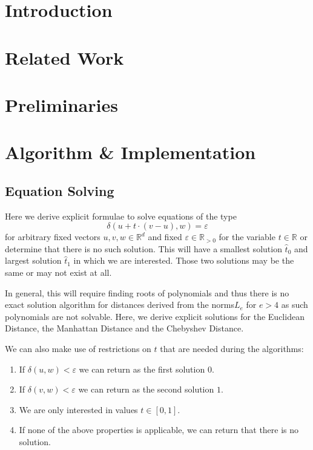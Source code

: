\newcommand{\N}{\mathbb{N}}
\newcommand{\Z}{\mathbb{Z}}
\newcommand{\R}{\mathbb{R}}


\renewcommand*{\O}{\mathcal{O}}

\section{Introduction}
\label{sec:introduction}

\section{Related Work}
\label{sec:related_work}

\section{Preliminaries}
\label{sec:preliminaries}

\section{Algorithm \& Implementation}
\label{sec:algorithm_implementation}


\subsection{Equation Solving}
\label{subsec:equation_solving}
Here we derive explicit formulae to solve equations of the type 
\begin{equation}
  \delta(u + t \cdot (v-u), w) = \varepsilon \label{eq:eq_solve_main}
\end{equation}
for arbitrary fixed vectors \(u, v, w \in \R^d\) and fixed \(\varepsilon \in \R_{>0}\) for the variable \(t \in \R\) or determine that there is no such solution. This will have a smallest solution \(\hat{t}_0\) and largest solution \(\hat{t}_1\) in which we are interested. Those two solutions may be the same or may not exist at all.

In general, this will require finding roots of polynomials and thus there is no exact solution algorithm for distances derived from the norms\(L_e\) for \(e > 4\) as such polynomials are not solvable. Here, we derive explicit solutions for the Euclidean Distance, the Manhattan Distance and the Chebyshev Distance. 

We can also make use of restrictions on \(t\) that are needed during the algorithms: 
\begin{enumerate}
  \item If \(\delta(u, w) < \varepsilon\) we can return as the first solution \(0\). 
  \item If \(\delta(v, w) < \varepsilon\) we can return as the second solution \(1\).
  \item We are only interested in values \(t\in [0, 1]\). 
  \item If none of the above properties is applicable, we can return that there is no solution.
\end{enumerate}

